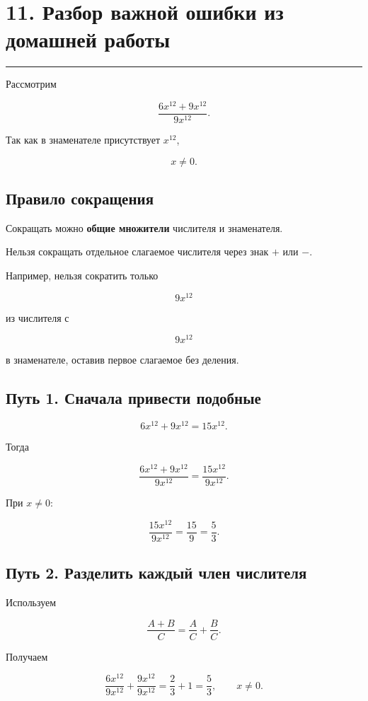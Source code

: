 \documentclass[a4paper,12pt]{article}
\newcommand{\sectionline}{\par\vspace{0.15em}\noindent\textcolor{accent}{\rule{\linewidth}{0.7pt}}\par\vspace{0.2em}}
\newcommand{\key}[1]{\textcolor{darkaccent}{\textbf{#1}}}
\begin{document}

\section*{11. Разбор важной ошибки из домашней работы}
\sectionline

Рассмотрим

\[
\frac{6x^{12}+9x^{12}}{9x^{12}}.
\]

Так как в знаменателе присутствует \(x^{12}\),

\[
x\ne0.
\]

\subsection*{Правило сокращения}

Сокращать можно \key{общие множители} числителя и знаменателя.

Нельзя сокращать отдельное слагаемое числителя через знак \(+\) или \(-\).

Например, нельзя сократить только

\[
9x^{12}
\]

из числителя с

\[
9x^{12}
\]

в знаменателе, оставив первое слагаемое без деления.

\subsection*{Путь 1. Сначала привести подобные}

\[
6x^{12}+9x^{12}=15x^{12}.
\]

Тогда

\[
\frac{6x^{12}+9x^{12}}{9x^{12}}
=
\frac{15x^{12}}{9x^{12}}.
\]

При \(x\ne0\):

\[
\frac{15x^{12}}{9x^{12}}
=
\frac{15}{9}
=
\boxed{\frac53}.
\]

\subsection*{Путь 2. Разделить каждый член числителя}

Используем

\[
\frac{A+B}{C}
=
\frac AC+\frac BC.
\]

Получаем

\[
\frac{6x^{12}}{9x^{12}}
+
\frac{9x^{12}}{9x^{12}}
=
\frac23+1
=
\boxed{\frac53},
\qquad
x\ne0.
\]
\end{document}
